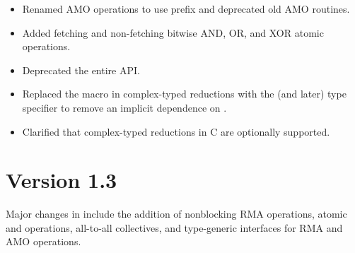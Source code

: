 \begin{itemize}
%
%
\item Renamed \ac{AMO} operations to use  prefix and
      deprecated old \ac{AMO} routines.
%
%
\item Added fetching and non-fetching bitwise AND, OR, and XOR atomic
      operations.
%
%
\item Deprecated the entire \Fortran \ac{API}.
%
%
\item Replaced the  macro in complex-typed reductions with the
      \Cstd[99] (and later) type specifier  to remove an
      implicit dependence on .
%
%
\item Clarified that complex-typed reductions in C are optionally supported.
%
%
\end{itemize}




\section{Version 1.3}
Major changes in \openshmem[1.3] include the addition of
nonblocking \ac{RMA} operations,
atomic \PUT{} and \GET{} operations,
all-to-all collectives,
and \Cstd[11] type-generic interfaces for \ac{RMA} and \ac{AMO} operations.

